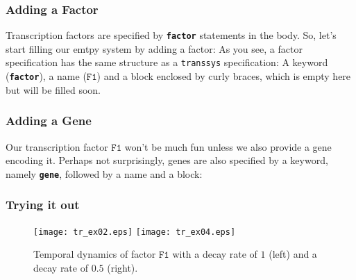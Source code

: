 \documentclass[12pt]{article}
\newcommand{\transsys}{\texttt{transsys}}
\newcommand{\factorsym}[1]{\ensuremath{\mathtt{#1}}}
\newcommand{\keyword}[1]{\textbf{\texttt{#1}}}
\begin{document}
\subsubsection{Adding a Factor}

Transcription factors are specified by \keyword{factor} statements in
the body. So, let's start filling our emtpy system by adding a factor:
As you see, a factor specification has the same structure as a
\transsys{} specification: A keyword (\keyword{factor}), a name
(\factorsym{F1}) and a block enclosed by curly braces, which is empty here
but will be filled soon.


\subsubsection{Adding a Gene}

Our transcription factor \factorsym{F1} won't be much fun unless we also
provide a gene encoding it. Perhaps not surprisingly, genes are also
specified by a keyword, namely \keyword{gene}, followed by a name and
a block:


\subsubsection{Trying it out}

\begin{figure}
\centerline{
\texttt{[image: tr\_ex02.eps]}
\texttt{[image: tr\_ex04.eps]}
}
\caption{\label{fig_onefactor}
  Temporal dynamics of factor \factorsym{F1} with a decay rate of $1$
  (left) and a decay rate of $0.5$ (right).
}
\end{figure}
\end{document}
